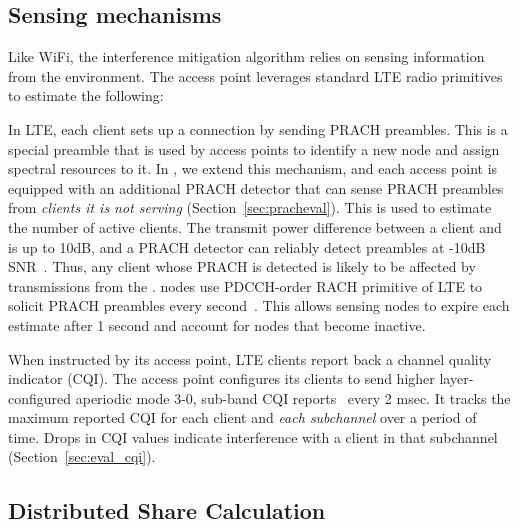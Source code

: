 \subsection{Sensing mechanisms}
\label{sec:sensing}

Like WiFi, the \cf interference mitigation algorithm relies on sensing information from the environment. The \cf access point leverages standard LTE radio primitives to estimate the following:

 In LTE, each client sets up a connection by sending PRACH preambles. 
This is a special preamble that is used by access points to identify a new node and assign spectral resources to it. 
In \cf, we extend this mechanism, and each access point is equipped with an additional PRACH detector that can sense PRACH preambles from \emph{clients it is not serving} (Section~\ref{sec:pracheval}).
This is used to estimate the number of active clients. 
The transmit power difference between a client and \eNB is up to 10dB, 
and a PRACH detector can reliably detect preambles at -10dB SNR~\cite{prach}. 
Thus, any client whose PRACH is detected is likely to be affected by transmissions from the \eNB. 
\cf nodes use PDCCH-order RACH primitive of LTE to solicit PRACH preambles every second~\cite{36_213}. 
This allows sensing nodes to expire each estimate after 1 second and account for nodes that become inactive. 


 When instructed by its access point, LTE clients report 
back a channel quality indicator (CQI). 
The \cf access point configures its clients to send higher layer-configured aperiodic mode 3-0, sub-band CQI reports~\cite{36_213} every 2 msec. 
It tracks the maximum reported CQI for each client and \emph{each subchannel} over a period of time. 
Drops in CQI values indicate interference with a client in that subchannel (Section~\ref{sec:eval_cqi}). 


\subsection{Distributed Share Calculation}
\label{sec:share-calculation}


